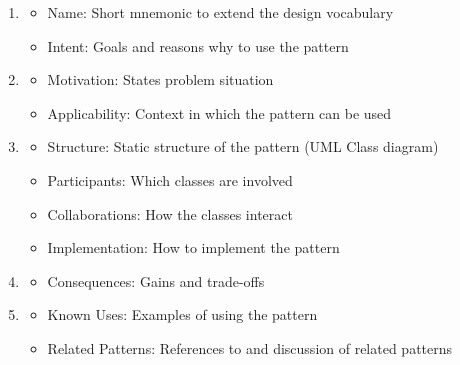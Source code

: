 \documentclass[
    ../../Software_Engineering_Summary.tex,
]
{subfiles}
\begin{document}
\begin{defbox}
    \begin{enumerate}
        \item 
        \begin{itemize}
            \item Name: Short mnemonic to extend the design vocabulary
            \item Intent: Goals and reasons why to use the pattern
        \end{itemize}
        \hrulefill
        \item 
        \begin{itemize}
            \item Motivation: States problem situation
            \item Applicability: Context in which the pattern can be used
        \end{itemize}
        \hrulefill
        \item 
        \begin{itemize}
            \item Structure: Static structure of the pattern (UML Class diagram)
            \item Participants: Which classes are involved 
            \item Collaborations: How the classes interact
            \item Implementation: How to implement the pattern
        \end{itemize}
        \hrulefill
        \item 
        \begin{itemize}
            \item Consequences: Gains and trade-offs
        \end{itemize}
        \hrulefill
        \item 
        \begin{itemize}
            \item Known Uses: Examples of using the pattern
            \item Related Patterns: References to and discussion of related patterns
        \end{itemize}
    \end{enumerate}
\end{defbox}
\end{document}
